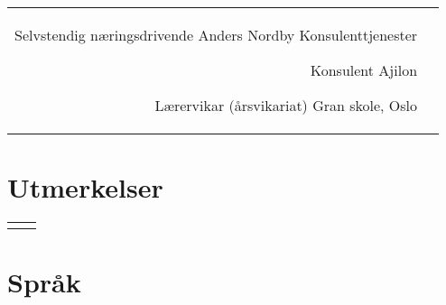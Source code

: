 \documentclass[10pt]{article} %
\begin{document}
\begin{paracol}{2}
\begin{supertabular}{rl}
	
	{Selvstendig næringsdrivende} %
	{} %
	{} %
	{Anders Nordby Konsulenttjenester} %
	
	{Konsulent} %
	{} %
	{} %
	{Ajilon} %
	
	{Lærervikar (årsvikariat)} %
	{} %
	{} %
	{Gran skole, Oslo} %
	

\end{supertabular}



\section{Utmerkelser}





\begin{supertabular}{rl} %
	
	
\end{supertabular}



\section{Språk} 


\end{paracol}
\end{document}
